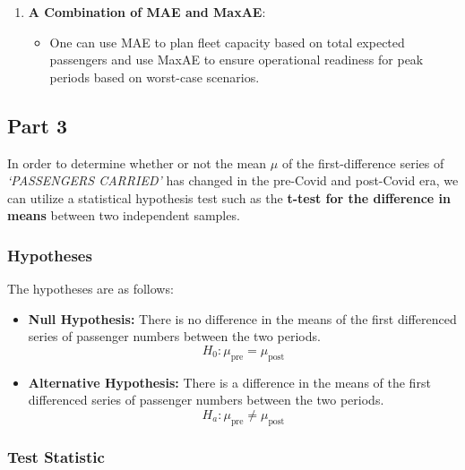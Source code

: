 \documentclass{article}
\begin{document}
\begin{enumerate}
\[
\text{MaxAE} = \max(|A_t - F_t|) \quad \text{for } t = 1, 2, \ldots, n
\]

\begin{itemize}
\item
  \textbf{Advantage:} It captures the worst-case scenario in terms of
  forecasting error. This is particularly critical for human resource
  planning.
\end{itemize}
\item \textbf{A Combination of MAE and MaxAE}:

  \begin{itemize}
      \item One can use MAE to plan fleet capacity based on total expected passengers and use MaxAE to ensure operational readiness for peak periods based on worst-case scenarios.
  \end{itemize}
  
\end{enumerate}

\newpage
\subsection{Part 3}

In order to determine whether or not the mean $\mu$ of the first-difference
series of \textit{`PASSENGERS CARRIED'} has changed in the pre-Covid and post-Covid era, we can utilize a statistical hypothesis test such as the \textbf{t-test for the difference in means} between two independent samples. 

\subsubsection{Hypotheses}

The hypotheses are as follows:

\begin{itemize}
\item
  \textbf{Null Hypothesis:} There is no difference in the means of the
  first differenced series of passenger numbers between the two periods.
    \[
    H_0: \mu_{\text{pre}} = \mu_{\text{post}}
    \]
\item
  \textbf{Alternative Hypothesis:} There is a difference in the means of
  the first differenced series of passenger numbers between the two
  periods.
    \[
    H_a: \mu_{\text{pre}} \neq \mu_{\text{post}}
    \]
\end{itemize}

\subsubsection{Test Statistic}
\end{document}
